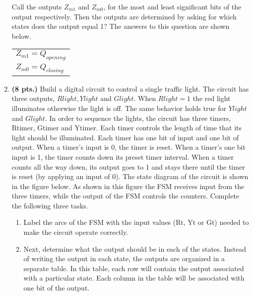 \begin{enumerate}
\begin{onlysolution}
{                Call the outputs $Z_{m1}$ and $Z_{m0}$, for the most and least
                significant bits of the output respectively.  Then the outputs
                are determined by asking for which states does the output
                equal 1?  The answers to this question are shown below.

                \begin{tabular}{l}
                    $Z_{m1} = Q_{opening}$ \\
                    $Z_{m0} = Q_{closing}$ \\
                \end{tabular}

            }
        \end{onlysolution}

    \item \textbf{ (8 pts.)}
        Build a digital circuit to control a single traffic light.  The circuit
        has three outputs, $Rlight, Ylight$ and $ Glight$.  When
        $Rlight=1$ the red light illuminates otherwise the light is off.
        The same behavior holds true for $Ylight$ and $Glight$.  In order
        to sequence the lights, the circuit has three timers, Rtimer, Gtimer and
        Ytimer.  Each timer controls the length of time that its light should be
        illuminated.  Each timer has one bit of input and one bit of output.  When a
        timer's input is 0, the timer is reset.  When a timer's one bit
        input is 1, the timer
        counts down its preset timer interval.  When a timer counts all the way down,
        its output goes to 1 and stays there until the timer is reset (by applying
        an input of 0).  The state diagram of the circuit is shown in the
        figure below.  As shown in this figure the FSM receives input from the
        three timers, while the output of the FSM controls the counters. Complete
        the following three tasks.


        \begin{enumerate}
            \item Label the arcs of the FSM with the input values (Rt, Yt or Gt)
                needed to make the circuit operate correctly.

            \item Next, determine what the output should be in each
                of the states.  Instead of writing the output in each state, the
                outputs are organized in a separate table.  In this table, each
                row will contain the output associated with a particular state.
                Each column in the table will be associated with one bit of the output.


\end{enumerate}
\end{enumerate}
